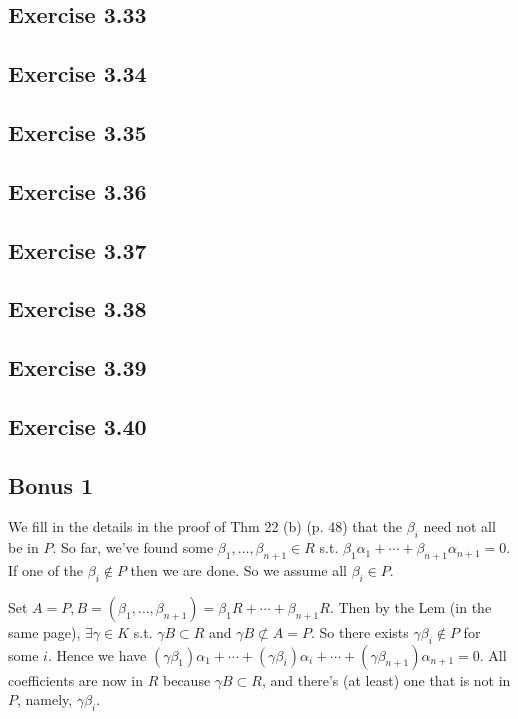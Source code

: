 \documentclass[../Marcus.tex]{subfiles}
\begin{document}
\subsection*{Exercise 3.33}

\subsection*{Exercise 3.34}

\subsection*{Exercise 3.35}

\subsection*{Exercise 3.36}

\subsection*{Exercise 3.37}

\subsection*{Exercise 3.38}

\subsection*{Exercise 3.39}

\subsection*{Exercise 3.40}

\subsection*{Bonus 1}

We fill in the details in the proof of Thm 22 (b) (p. 48) that the $\beta_i$ need not all be in $P$. So far, we've found some $\beta_1,\ldots,\beta_{n+1}\in R$ s.t. $\beta_1\alpha_1+\cdots+\beta_{n+1}\alpha_{n+1}=0$. If one of the $\beta_i\notin P$ then we are done. So we assume all $\beta_i\in P$. 

Set $A=P,B=(\beta_1,\ldots,\beta_{n+1})=\beta_1R+\cdots+\beta_{n+1}R$. Then by the Lem (in the same page), $\exists \gamma\in K$ s.t. $\gamma B\subset R$ and $\gamma B\not\subset A=P$. So there exists $\gamma\beta_i\notin P$ for some $i$. Hence we have $(\gamma\beta_1)\alpha_1+\cdots+(\gamma\beta_i)\alpha_i+\cdots+(\gamma\beta_{n+1})\alpha_{n+1}=0$. All coefficients are now in $R$ because $\gamma B\subset R$, and there's (at least) one that is not in $P$, namely, $\gamma\beta_i$.
\end{document}
